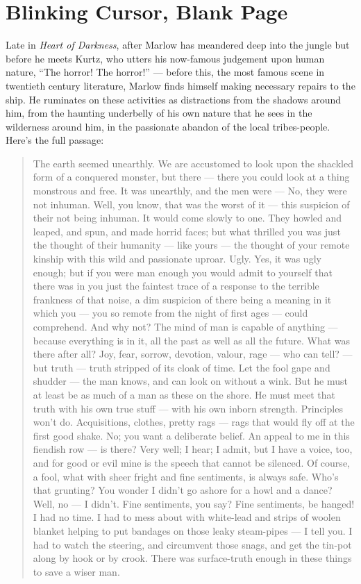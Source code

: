 \documentclass[letterpaper,10pt,headsepline]{scrreprt}
\begin{document}
\section{Blinking Cursor, Blank Page}
Late in \textit{Heart of Darkness}, after Marlow has meandered deep
into the jungle but before he meets Kurtz, who utters his now-famous
judgement upon human nature, ``The horror! The horror!'' --- before
this, the most famous scene in twentieth century literature, Marlow
finds himself making necessary repairs to the ship. He ruminates on
these activities as distractions from the shadows around him, from the
haunting underbelly of his own nature that he sees in the wilderness
around him, in the passionate abandon of the local tribes-people.
Here's the full passage:
\begin{quotation}
  The earth seemed unearthly. We are accustomed to look upon the
  shackled form of a conquered monster, but there --- there you could
  look at a thing monstrous and free. It was unearthly, and the men
  were --- No, they were not inhuman. Well, you know, that was the
  worst of it --- this suspicion of their not being inhuman. It would
  come slowly to one. They howled and leaped, and spun, and made
  horrid faces; but what thrilled you was just the thought of their
  humanity --- like yours --- the thought of your remote kinship with
  this wild and passionate uproar. Ugly. Yes, it was ugly enough; but
  if you were man enough you would admit to yourself that there was in
  you just the faintest trace of a response to the terrible frankness
  of that noise, a dim suspicion of there being a meaning in it which
  you --- you so remote from the night of first ages --- could
  comprehend. And why not? The mind of man is capable of anything ---
  because everything is in it, all the past as well as all the future.
  What was there after all? Joy, fear, sorrow, devotion, valour, rage
  --- who can tell? --- but truth --- truth stripped of its cloak of
  time. Let the fool gape and shudder --- the man knows, and can look
  on without a wink. But he must at least be as much of a man as these
  on the shore. He must meet that truth with his own true stuff ---
  with his own inborn strength. Principles won't do. Acquisitions,
  clothes, pretty rags --- rags that would fly off at the first good
  shake. No; you want a deliberate belief. An appeal to me in this
  fiendish row --- is there? Very well; I hear; I admit, but I have a
  voice, too, and for good or evil mine is the speech that cannot be
  silenced. Of course, a fool, what with sheer fright and fine
  sentiments, is always safe. Who's that grunting? You wonder I didn't
  go ashore for a howl and a dance? Well, no --- I didn't. Fine
  sentiments, you say? Fine sentiments, be hanged! I had no time. I
  had to mess about with white-lead and strips of woolen blanket
  helping to put bandages on those leaky steam-pipes --- I tell you. I
  had to watch the steering, and circumvent those snags, and get the
  tin-pot along by hook or by crook. There was surface-truth enough in
  these things to save a wiser man.
\end{quotation}
\end{document}
